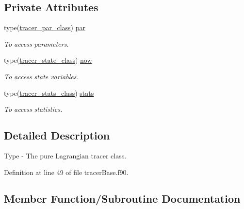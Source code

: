 \subsection*{Private Attributes}
\begin{DoxyCompactItemize}
\item 
type(\mbox{\hyperlink{structtracerbase__mod_1_1tracer__par__class}{tracer\+\_\+par\+\_\+class}}) \mbox{\hyperlink{structtracerbase__mod_1_1tracer__class_aca04297200aad39fd04e31b630d9ca50}{par}}
\begin{DoxyCompactList}\small\item\em To access parameters. \end{DoxyCompactList}\item 
type(\mbox{\hyperlink{structtracerbase__mod_1_1tracer__state__class}{tracer\+\_\+state\+\_\+class}}) \mbox{\hyperlink{structtracerbase__mod_1_1tracer__class_ad1a1e2f727ad281e2562952d6ba94526}{now}}
\begin{DoxyCompactList}\small\item\em To access state variables. \end{DoxyCompactList}\item 
type(\mbox{\hyperlink{structtracerbase__mod_1_1tracer__stats__class}{tracer\+\_\+stats\+\_\+class}}) \mbox{\hyperlink{structtracerbase__mod_1_1tracer__class_a161370f3c716daedca72414a3751c56a}{stats}}
\begin{DoxyCompactList}\small\item\em To access statistics. \end{DoxyCompactList}\end{DoxyCompactItemize}


\subsection{Detailed Description}
Type -\/ The pure Lagrangian tracer class. 

Definition at line 49 of file tracer\+Base.\+f90.



\subsection{Member Function/\+Subroutine Documentation}
\mbox{\label{structtracerbase__mod_1_1tracer__class_a1142993acbb67b4fe43c52b554165e71}} 
